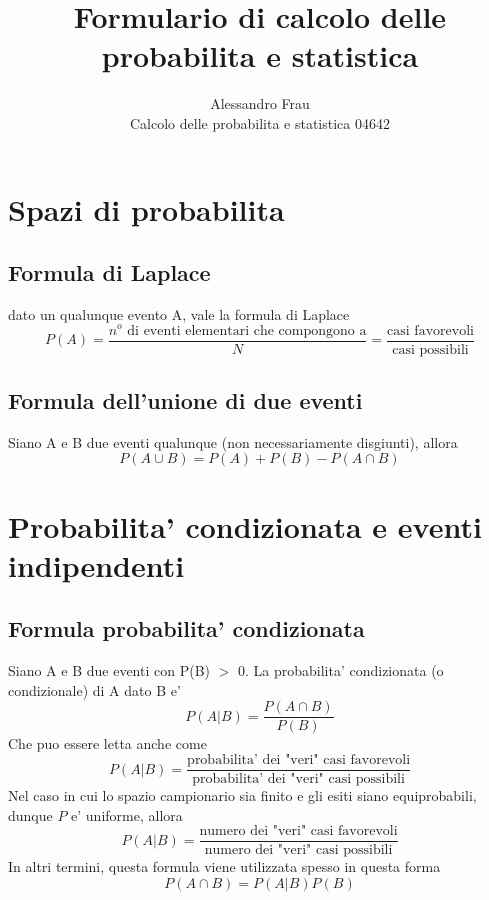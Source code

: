 \documentclass{article}
\begin{document}
\title{Formulario di calcolo delle probabilita e statistica} 
\author{Alessandro Frau\\Calcolo delle probabilita e statistica 04642}
\maketitle
\tableofcontents
\section{Spazi di probabilita}
\subsection{Formula di Laplace}
dato un qualunque evento A, vale la formula di Laplace \newline
$$ P(A) = \frac{n^o\mbox{ di eventi elementari che compongono a}}{N} = \frac{\mbox{casi favorevoli}}{\mbox{casi possibili}} $$

\subsection{Formula dell'unione di due eventi}
Siano A e B due eventi qualunque (non necessariamente disgiunti), allora\newline
$$ P(A \cup B) = P(A) + P(B) - P(A \cap B)$$
\newpage
\section{Probabilita' condizionata e eventi indipendenti}
\subsection{Formula probabilita' condizionata}
Siano A e B due eventi con P(B) $>$ 0. La probabilita' condizionata (o condizionale) di A dato B e'\newline
$$ P(A|B) = \frac{P(A \cap B)}{P(B)}$$\newline
Che puo essere letta anche come\newline
$$ P(A|B) = \frac{\mbox{probabilita' dei "veri" casi favorevoli}}{\mbox{probabilita' dei "veri" casi possibili}}$$\newline
Nel caso in cui lo spazio campionario sia finito e gli esiti siano equiprobabili, dunque $P$ e' uniforme, allora\newline
$$ P(A|B) = \frac{\mbox{numero dei "veri" casi favorevoli}}{\mbox{numero dei "veri" casi possibili}}$$\newline
In altri termini, questa formula viene utilizzata spesso in questa forma\newline
$$P(A\cap B) = P(A|B)P(B)$$
\end{document}
